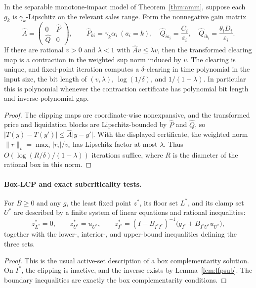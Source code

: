\documentclass{llncs}
\newcommand{\eps}{\varepsilon}
\begin{document}
\begin{proposition}
\label{prop:lip}
In the separable monotone-impact model of Theorem~\ref{thm:amm}, suppose each \(g_k\) is \(\gamma_k\)-Lipschitz on the relevant sales range. Form the nonnegative gain matrix
\[
\widehat A=\begin{pmatrix}0&\widehat P\\ \widehat Q&0\end{pmatrix},
\qquad
\widehat P_{ki}=\gamma_k\alpha_i\ (a_i=k),\quad
\widehat Q_{i a_i}=\frac{C_i}{\eps_i},\quad
\widehat Q_{i b_i}=\frac{\theta_iD_i}{\eps_i}.
\]
If there are rational \(v>0\) and \(\lambda<1\) with \(\widehat A v\le\lambda v\), then the transformed clearing map is a contraction in the weighted sup norm induced by \(v\). The clearing is unique, and fixed-point iteration computes a \(\delta\)-clearing in time polynomial in the input size, the bit length of \((v,\lambda)\), \(\log(1/\delta)\), and \(1/(1-\lambda)\). In particular this is polynomial whenever the contraction certificate has polynomial bit length and inverse-polynomial gap.
\end{proposition}
\begin{proof}
The clipping maps are coordinate-wise nonexpansive, and the transformed price and liquidation blocks are Lipschitz-bounded by \(\widehat P\) and \(\widehat Q\), so \(|T(y)-T(y')|\le\widehat A|y-y'|\). With the displayed certificate, the weighted norm \(\|r\|_v=\max_i |r_i|/v_i\) has Lipschitz factor at most \(\lambda\). Thus \(O(\log(R/\delta)/(1-\lambda))\) iterations suffice, where \(R\) is the diameter of the rational box in this norm.
\end{proof}

\paragraph{Box-LCP and exact subcriticality tests.}
\begin{lemma}
\label{thm:bakerfree}
For \(B\ge0\) and any \(g\), the least fixed point \(z^\ast\), its floor set \(L^\ast\), and its clamp set \(U^\ast\) are described by a finite system of linear equations and rational inequalities:
\[
        z^\ast_{L^\ast}=0,\qquad z^\ast_{U^\ast}=u_{U^\ast},\qquad
        z^\ast_{I^\ast}
        =(I-B_{I^\ast I^\ast})^{-1}\bigl(g_{I^\ast}+B_{I^\ast U^\ast}u_{U^\ast}\bigr),
\]
together with the lower-, interior-, and upper-bound inequalities defining the three sets.
\end{lemma}
\begin{proof}
This is the usual active-set description of a box complementarity solution. On \(I^\ast\), the clipping is inactive, and the inverse exists by Lemma~\ref{lem:lfpsub}. The boundary inequalities are exactly the box complementarity conditions.
\end{proof}
\end{document}
